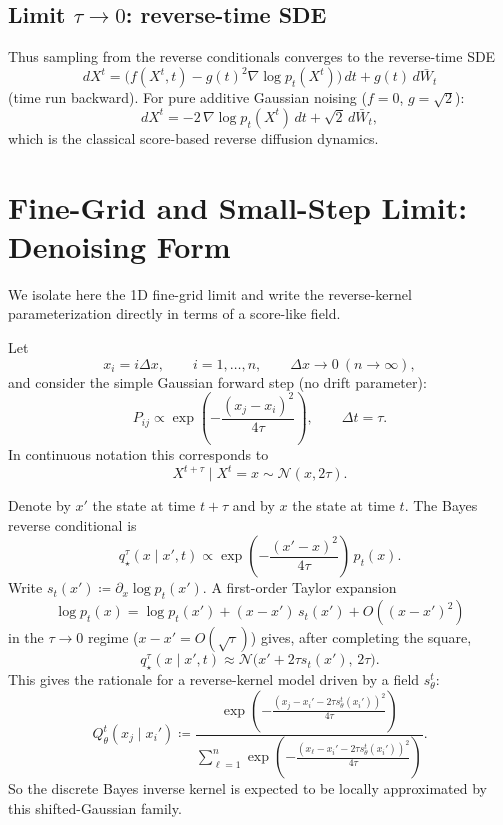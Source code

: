 \documentclass[11pt]{article}
\begin{document}
\subsection{Limit $\tau\to 0$: reverse-time SDE}
Thus sampling from the reverse conditionals converges to the reverse-time SDE
\[
dX^t=\big(f(X^t,t)-g(t)^2\nabla\log p_t(X^t)\big)\,dt+g(t)\,d\bar W_t
\]
(time run backward).
For pure additive Gaussian noising ($f=0$, $g=\sqrt2$):
\[
dX^t=-2\,\nabla\log p_t(X^t)\,dt+\sqrt2\,d\bar W_t,
\]
which is the classical score-based reverse diffusion dynamics.

\section{Fine-Grid and Small-Step Limit: Denoising Form}
We isolate here the 1D fine-grid limit and write the reverse-kernel parameterization directly in terms of a score-like field.

Let
\[
x_i=i\Delta x,\qquad i=1,\dots,n,\qquad \Delta x\to 0\ (n\to\infty),
\]
and consider the simple Gaussian forward step (no drift parameter):
\[
P_{ij}\propto \exp\!\left(-\frac{(x_j-x_i)^2}{4\tau}\right),
\qquad \Delta t=\tau.
\]
In continuous notation this corresponds to
\[
X^{t+\tau}\mid X^t=x \sim \mathcal N(x,2\tau).
\]

Denote by $x'$ the state at time $t+\tau$ and by $x$ the state at time $t$. The Bayes reverse conditional is
\[
q_\star^\tau(x\mid x',t)\propto
\exp\!\left(-\frac{(x'-x)^2}{4\tau}\right)\,p_t(x).
\]
Write $s_t(x')\coloneqq \partial_x\log p_t(x')$. A first-order Taylor expansion
\[
\log p_t(x)=\log p_t(x')+(x-x')\,s_t(x')+O((x-x')^2)
\]
in the $\tau\to0$ regime ($x-x'=O(\sqrt{\tau})$) gives, after completing the square,
\[
q_\star^\tau(x\mid x',t)\approx
\mathcal N\!\big(x'+2\tau s_t(x'),\,2\tau\big).
\]
This gives the rationale for a reverse-kernel model driven by a field $s_\theta^t$:
\begin{equation}
\label{eq:qtheta-discrete-grid}
Q_\theta^t(x_j\mid x_i')
\coloneqq
\frac{\exp\!\left(-\frac{(x_j-x_i'-2\tau s_\theta^t(x_i'))^2}{4\tau}\right)}
{\sum_{\ell=1}^n \exp\!\left(-\frac{(x_\ell-x_i'-2\tau s_\theta^t(x_i'))^2}{4\tau}\right)}.
\end{equation}
So the discrete Bayes inverse kernel is expected to be locally approximated by this shifted-Gaussian family.
\end{document}

